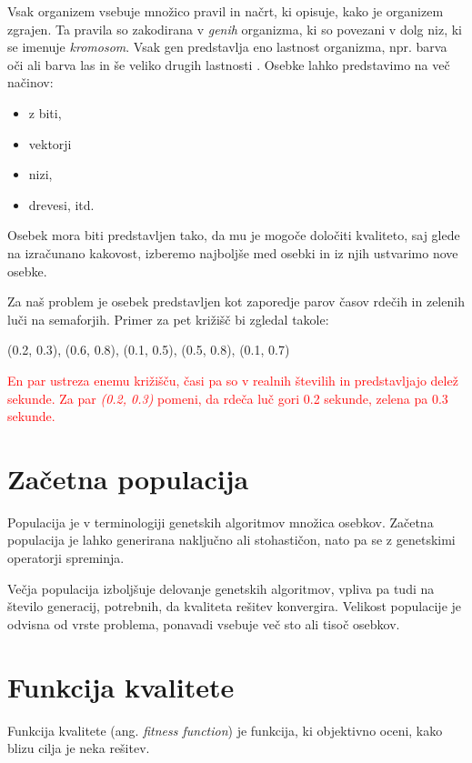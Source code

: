 \documentclass[a4paper, 12pt]{book}
\begin{document}
Vsak organizem vsebuje mno\v zico pravil in na\v crt, ki opisuje, kako je organizem zgrajen. Ta pravila so zakodirana v \textit{genih} organizma, ki so povezani v dolg niz, ki se imenuje \textit{kromosom}. Vsak gen predstavlja eno lastnost organizma, npr. barva o\v ci ali barva las in \v se veliko drugih lastnosti
\cite{aijunkie}. Osebke lahko predstavimo na ve\v c na\v cinov:

\begin{itemize} \itemsep0em
\item z biti,
\item vektorji
\item nizi,
\item drevesi, itd.
\end{itemize}

Osebek mora biti predstavljen tako, da mu je mogo\v ce dolo\v citi kvaliteto, saj glede na izra\v cunano kakovost, izberemo najbolj\v se med osebki in iz njih ustvarimo nove osebke.

Za na\v s problem je osebek predstavljen kot zaporedje parov \v casov rde\v cih in zelenih lu\v ci na semaforjih. Primer za pet kri\v zi\v s\v c bi zgledal takole:
\begin{center}
(0.2, 0.3), (0.6, 0.8), (0.1, 0.5), (0.5, 0.8), (0.1, 0.7)
\end{center}

\textcolor{red}{En par ustreza enemu kri\v zi\v s\v cu, \v casi pa so v realnih \v stevilih in predstavljajo dele\v z sekunde. Za par \textit{(0.2, 0.3)} pomeni, da rde\v ca lu\v c gori 0.2 sekunde, zelena pa 0.3 sekunde.}

\section{Za\v cetna populacija}
Populacija je v terminologiji genetskih algoritmov mno\v zica osebkov. Za\v cetna populacija je lahko generirana naklju\v cno ali stohasti\v con, nato pa se z genetskimi operatorji spreminja.

Ve\v cja populacija izbolj\v suje delovanje genetskih algoritmov, vpliva pa tudi na \v stevilo generacij, potrebnih, da kvaliteta re\v sitev konvergira. Velikost populacije je odvisna od vrste problema, ponavadi vsebuje ve\v c sto ali tiso\v c osebkov.

\section{Funkcija kvalitete}
Funkcija kvalitete (ang. \textit{fitness function}) je funkcija, ki objektivno oceni, kako blizu cilja je neka re\v sitev.
\end{document}
